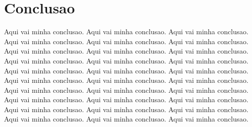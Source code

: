\documentclass[10pt, conference]{IEEEtran}
\begin{document}


%



%


\section{Conclusao}
%
Aqui vai minha conclusao. Aqui vai minha conclusao. Aqui vai minha conclusao. Aqui vai minha conclusao. Aqui vai minha conclusao. Aqui vai minha conclusao. Aqui vai minha conclusao. Aqui vai minha conclusao. Aqui vai minha conclusao. Aqui vai minha conclusao. Aqui vai minha conclusao. Aqui vai minha conclusao. Aqui vai minha conclusao. Aqui vai minha conclusao. Aqui vai minha conclusao. Aqui vai minha conclusao. Aqui vai minha conclusao. Aqui vai minha conclusao. Aqui vai minha conclusao. Aqui vai minha conclusao. Aqui vai minha conclusao. Aqui vai minha conclusao. Aqui vai minha conclusao. Aqui vai minha conclusao. Aqui vai minha conclusao. Aqui vai minha conclusao. Aqui vai minha conclusao. Aqui vai minha conclusao. Aqui vai minha conclusao. Aqui vai minha conclusao.
\end{document}
